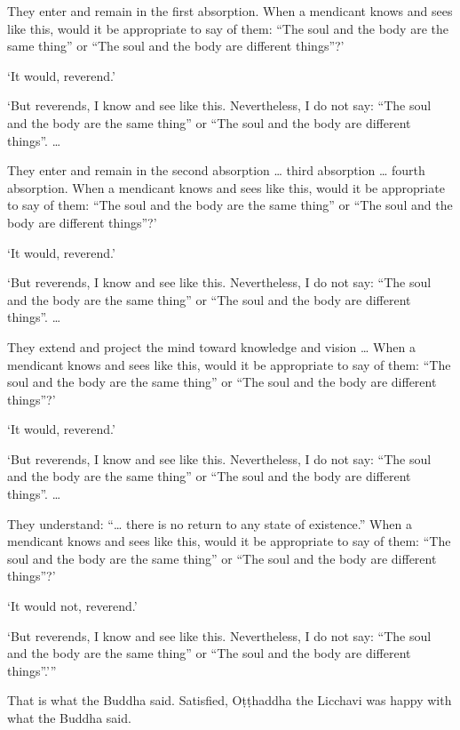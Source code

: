 \documentclass[12pt,openany]{book}%
\begin{document}
They enter and remain in the first absorption. When a mendicant knows and sees like this, would it be appropriate to say of them: “The soul and the body are the same thing” or “The soul and the body are different things”?’ 

‘It would, reverend.’ 

‘But reverends, I know and see like this. Nevertheless, I do not say: “The soul and the body are the same thing” or “The soul and the body are different things”. … 

They enter and remain in the second absorption … third absorption … fourth absorption. When a mendicant knows and sees like this, would it be appropriate to say of them: “The soul and the body are the same thing” or “The soul and the body are different things”?’ 

‘It would, reverend.’ 

‘But reverends, I know and see like this. Nevertheless, I do not say: “The soul and the body are the same thing” or “The soul and the body are different things”. … 

They extend and project the mind toward knowledge and vision … When a mendicant knows and sees like this, would it be appropriate to say of them: “The soul and the body are the same thing” or “The soul and the body are different things”?’ 

‘It would, reverend.’ 

‘But reverends, I know and see like this. Nevertheless, I do not say: “The soul and the body are the same thing” or “The soul and the body are different things”. … 

They understand: “… there is no return to any state of existence.” When a mendicant knows and sees like this, would it be appropriate to say of them: “The soul and the body are the same thing” or “The soul and the body are different things”?’ 

‘It would not, reverend.’ 

‘But reverends, I know and see like this. Nevertheless, I do not say: “The soul and the body are the same thing” or “The soul and the body are different things”.’” 

That is what the Buddha said. Satisfied, \textsanskrit{Oṭṭhaddha} the Licchavi was happy with what the Buddha said. 
\end{document}
